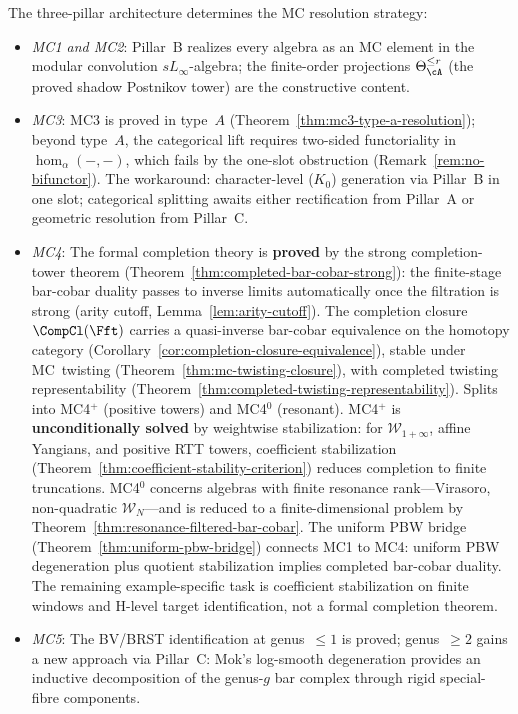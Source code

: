 \begin{remark}
\label{rem:three-pillar-mc-unification}
The three-pillar architecture determines the MC resolution strategy:
\begin{itemize}
\item \emph{MC1 and MC2}:  Pillar~B realizes every algebra as an MC
  element in the modular convolution $sL_\infty$-algebra; the
  finite-order projections $\Theta_\cA^{\leq r}$ (the proved shadow
  Postnikov tower) are the constructive content.
\item \emph{MC3}:  MC3 is proved in type~$A$ (Theorem~\ref{thm:mc3-type-a-resolution}); beyond type~$A$, the categorical lift requires two-sided functoriality
  in $\operatorname{hom}_\alpha(-,-)$, which fails by the one-slot
  obstruction (Remark~\ref{rem:no-bifunctor}).  The workaround:
  character-level ($K_0$) generation via Pillar~B in one slot;
  categorical splitting awaits either rectification from Pillar~A
  or geometric resolution from Pillar~C.
\item \emph{MC4}:  The formal completion theory is \textbf{proved} by
  the strong completion-tower theorem
  (Theorem~\ref{thm:completed-bar-cobar-strong}): the finite-stage
  bar-cobar duality passes to inverse limits automatically once the
  filtration is strong (arity cutoff, Lemma~\ref{lem:arity-cutoff}).
  The completion closure $\CompCl(\Fft)$ carries a quasi-inverse
  bar-cobar equivalence on the homotopy category
  (Corollary~\ref{cor:completion-closure-equivalence}), stable under
  MC~twisting (Theorem~\ref{thm:mc-twisting-closure}), with completed
  twisting representability
  (Theorem~\ref{thm:completed-twisting-representability}).
  Splits into MC4$^+$ (positive towers) and MC4$^0$ (resonant).
  MC4$^+$ is \textbf{unconditionally solved} by weightwise
  stabilization: for $\mathcal{W}_{1+\infty}$, affine Yangians, and
  positive RTT towers, coefficient stabilization
  (Theorem~\ref{thm:coefficient-stability-criterion}) reduces
  completion to finite truncations.  MC4$^0$ concerns algebras with
  finite resonance rank---Virasoro, non-quadratic
  $\mathcal{W}_N$---and is reduced to a finite-dimensional problem
  by Theorem~\ref{thm:resonance-filtered-bar-cobar}.  The uniform
  PBW bridge (Theorem~\ref{thm:uniform-pbw-bridge}) connects MC1
  to MC4: uniform PBW degeneration plus quotient stabilization
  implies completed bar-cobar duality.
  The remaining example-specific task is coefficient stabilization on
  finite windows and H-level target identification, not a formal
  completion theorem.
\item \emph{MC5}:  The BV/BRST identification at genus~$\leq 1$ is
  proved; genus~$\geq 2$ gains a new approach via Pillar~C: Mok's
  log-smooth degeneration provides an inductive decomposition of the
  genus-$g$ bar complex through rigid special-fibre components.
\end{itemize}
\end{remark}

